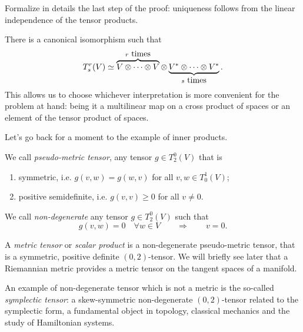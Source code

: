 \begin{exercise}
  Formalize in details the last step of the proof: uniqueness follows from the linear independence of the tensor products.
\end{exercise}

\begin{remark}
  There is a canonical isomorphism such that
  \begin{equation}
    T^r_s(V) \simeq \LaTeXoverbrace{V\otimes \cdots \otimes V}^{r\mbox{ times}} \otimes \LaTeXunderbrace{V^*\otimes \cdots \otimes V^*}_{s\mbox{ times}}.
  \end{equation}
  This allows us to choose whichever interpretation is more convenient for the problem at hand: being it a multilinear map on a cross product of spaces or an element of the tensor product of spaces.
\end{remark}


Let's go back for a moment to the example of inner products.

\begin{definition}\label{def:metric}
  We call \emph{pseudo-metric tensor}, any tensor $g\in T_2^0(V)$ that is
  \begin{enumerate}
    \item symmetric, i.e. $g(v,w) = g(w,v)$ for all $v,w\in T_0^1(V)$;
    \item positive semidefinite, i.e. $g(v,v)\geq0$ for all $v\neq 0$.
  \end{enumerate}

  We call \emph{non-degenerate} any tensor $g\in T_2^0(V)$ such that
  \begin{equation}
    g(v,w) = 0 \quad\forall w\in V \qquad\Longrightarrow\qquad v=0.
  \end{equation}

  A \emph{metric tensor} or \emph{scalar product} is a non-degenerate pseudo-metric tensor, that is a symmetric, positive definite $(0,2)$-tensor.
  We will briefly see later that a Riemannian metric provides a metric tensor on the tangent spaces of a manifold.

  An example of non-degenerate tensor which is not a metric is the so-called \emph{symplectic tensor}: a skew-symmetric non-degenerate $(0,2)$-tensor related to the symplectic form, a fundamental object in topology, classical mechanics and the study of Hamiltonian systems.
\end{definition}

